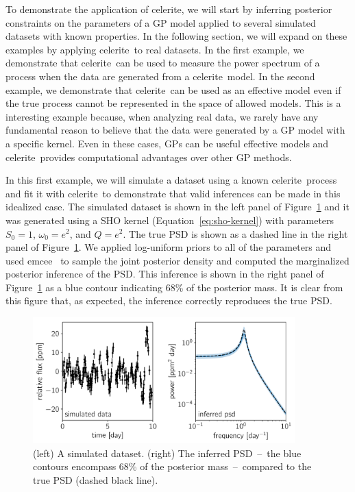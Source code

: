 \documentclass[manuscript, letterpaper]{aastex6}
\makeatletter
\let\origsubsection\subsection
\renewcommand\subsection{\@ifstar{\starsubsection}{\nostarsubsection}}
\newcommand\nostarsubsection[1]{\subsectionprelude\origsubsection{#1}}
\newcommand\starsubsection[1]{\subsectionprelude\origsubsection*{#1}}
\newcommand\subsectionprelude{\vspace{1em}}
\newcommand{\project}[1]{\textsf{#1}}
\newcommand{\celerite}{\project{celerite}}
\newcommand{\emcee}{\project{emcee}}
\newcommand{\figureref}[1]{\ref{fig:#1}}
\newcommand{\Figure}[1]{Figure~\figureref{#1}}
\newcommand{\figurelabel}[1]{\label{fig:#1}}
\renewcommand{\eqref}[1]{\ref{eq:#1}}
\newcommand{\eqalt}[1]{Equation~\eqref{#1}}
\makeatother
\begin{document}
To demonstrate the application of \celerite, we will start by inferring
posterior constraints on the parameters of a GP model applied to several
simulated datasets with known properties.
In the following section, we will expand on these examples by applying
\celerite\ to real datasets.
In the first example, we demonstrate that \celerite\ can be used to measure
the power spectrum of a process when the data are generated from a \celerite\
model.
In the second example, we demonstrate that \celerite\ can be used as an
effective model even if the true process cannot be represented in the space of
allowed models.
This is a interesting example because, when analyzing real data, we rarely
have any fundamental reason to believe that the data were generated by a GP
model with a specific kernel.
Even in these cases, GPs can be useful effective models and \celerite\
provides computational advantages over other GP methods.

\subsection{Recovery of a celerite process}

In this first example, we will simulate a dataset using a known \celerite\
process and fit it with \celerite\ to demonstrate that valid inferences can be
made in this idealized case.
The simulated dataset is shown in the left panel of \Figure{simulated-correct}
and it was generated using a SHO kernel (\eqalt{sho-kernel}) with parameters
$S_0 = 1$, $\omega_0 = e^2$, and $Q = e^2$.
The true PSD is shown as a dashed line in the right panel of
\Figure{simulated-correct}.
We applied log-uniform priors to all of the parameters and used \emcee\
\citep{Foreman-Mackey:2013} to sample the joint posterior density and computed
the marginalized posterior inference of the PSD.
This inference is shown in the right panel of \Figure{simulated-correct} as a
blue contour indicating 68\% of the posterior mass.
It is clear from this figure that, as expected, the inference correctly
reproduces the true PSD.


\begin{figure}[!htbp]
\begin{center}
\includegraphics[width=0.9\textwidth]{figures/simulated/correct.pdf}
\caption{(left) A simulated dataset.
    (right) The inferred PSD~--~the blue contours encompass 68\% of the
    posterior mass~--~compared to the true PSD (dashed black line).
    \figurelabel{simulated-correct}}
\end{center}
\end{figure}
\end{document}
